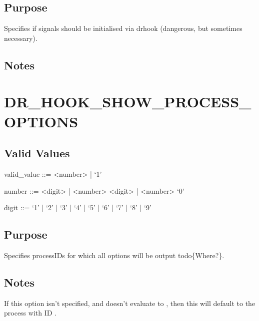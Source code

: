 \documentclass[letterpaper,10pt,english]{sphinxmanual}
\begin{document}
\subsection{Purpose}
\label{\detokenize{flag/flag:id30}}
\sphinxAtStartPar
Specifies if signals should be initialised via drhook (dangerous, but sometimes necessary).


\subsection{Notes}
\label{\detokenize{flag/flag:id31}}

\section{DR\_HOOK\_SHOW\_PROCESS\_OPTIONS}
\label{\detokenize{flag/flag:dr-hook-show-process-options}}\label{\detokenize{flag/flag:id34}}

\subsection{Valid Values}
\label{\detokenize{flag/flag:id35}}
\begin{DUlineblock}{0em}
\item[] valid\_value ::= \textless{}number\textgreater{} | ‘\sphinxhyphen{}1’
\item[] number ::= \textless{}digit\textgreater{} | \textless{}number\textgreater{} \textless{}digit\textgreater{} | \textless{}number\textgreater{} ‘0’
\item[] digit ::= ‘1’ | ‘2’ | ‘3’ | ‘4’ | ‘5’ | ‘6’ | ‘7’ | ‘8’ | ‘9’
\end{DUlineblock}


\subsection{Purpose}
\label{\detokenize{flag/flag:id36}}
\sphinxAtStartPar
Specifies processIDs for which all options will be output todo\{Where?\}.


\subsection{Notes}
\label{\detokenize{flag/flag:id37}}
\sphinxAtStartPar
If this option isn’t specified, and {\hyperref[\detokenize{flag/flag:dr-hook-silent}]{}} doesn’t evaluate to , then this will default to the process with ID .
\end{document}
